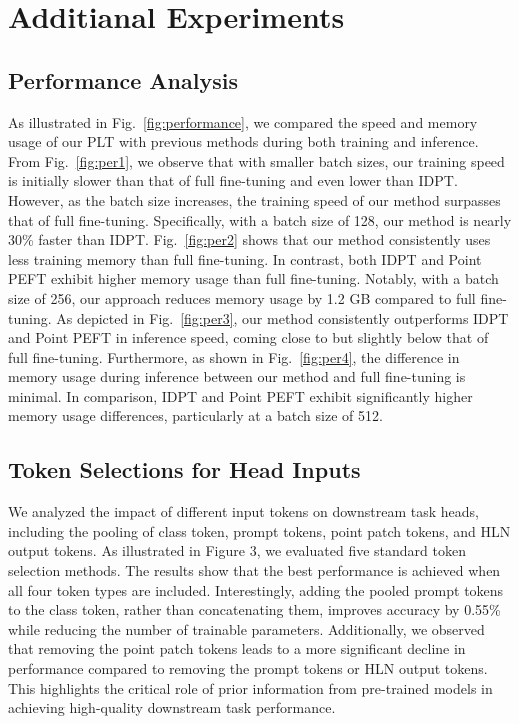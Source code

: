 \section{Additianal Experiments}

\subsection{Performance Analysis}
As illustrated in Fig.~\ref{fig:performance}, we compared the speed and memory usage of our PLT with previous methods during both training and inference. From Fig.~\ref{fig:per1}, we observe that with smaller batch sizes, our training speed is initially slower than that of full fine-tuning and even lower than IDPT. However, as the batch size increases, the training speed of our method surpasses that of full fine-tuning. Specifically, with a batch size of 128, our method is nearly 30\% faster than IDPT. Fig.~\ref{fig:per2} shows that our method consistently uses less training memory than full fine-tuning. In contrast, both IDPT and Point PEFT exhibit higher memory usage than full fine-tuning. Notably, with a batch size of 256, our approach reduces memory usage by 1.2 GB compared to full fine-tuning. As depicted in Fig.~\ref{fig:per3}, our method consistently outperforms IDPT and Point PEFT in inference speed, coming close to but slightly below that of full fine-tuning. Furthermore, as shown in Fig.~\ref{fig:per4}, the difference in memory usage during inference between our method and full fine-tuning is minimal. In comparison, IDPT and Point PEFT exhibit significantly higher memory usage differences, particularly at a batch size of 512.

\subsection{Token Selections for Head Inputs}
We analyzed the impact of different input tokens on downstream task heads, including the pooling of class token, prompt tokens, point patch tokens, and HLN output tokens. As illustrated in Figure 3, we evaluated five standard token selection methods. The results show that the best performance is achieved when all four token types are included. Interestingly, adding the pooled prompt tokens to the class token, rather than concatenating them, improves accuracy by 0.55\% while reducing the number of trainable parameters. Additionally, we observed that removing the point patch tokens leads to a more significant decline in performance compared to removing the prompt tokens or HLN output tokens. This highlights the critical role of prior information from pre-trained models in achieving high-quality downstream task performance.

